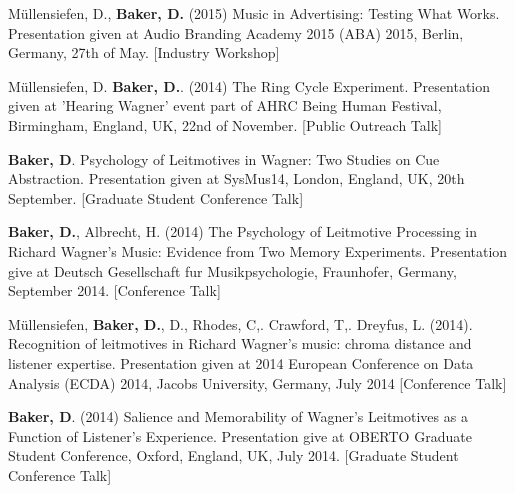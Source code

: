 M\"{u}llensiefen, D., \textbf{Baker, D.} (2015) Music in Advertising: Testing What Works. Presentation given at Audio Branding Academy 2015 (ABA) 2015, Berlin, Germany, 27th of May. [Industry Workshop]

M\"{u}llensiefen, D. \textbf{Baker, D.}. (2014) The Ring Cycle Experiment. Presentation given at 'Hearing Wagner' event part of AHRC Being Human Festival, Birmingham, England, UK, 22nd of November. [Public Outreach Talk]

\textbf{Baker, D}. Psychology of Leitmotives in Wagner: Two Studies on Cue Abstraction. Presentation given at SysMus14, London, England, UK, 20th September. [Graduate Student Conference Talk]

\textbf{Baker, D.}, Albrecht, H. (2014) The Psychology of Leitmotive Processing in Richard Wagner's Music: Evidence from Two Memory Experiments. Presentation give at Deutsch Gesellschaft fur Musikpsychologie, Fraunhofer, Germany, September 2014. [Conference Talk]

M\"{u}llensiefen, \textbf{Baker, D.}, D., Rhodes, C,. Crawford, T,. Dreyfus, L. (2014). Recognition of leitmotives in Richard Wagner's music: chroma distance and listener expertise. Presentation given at 2014 European Conference on Data Analysis (ECDA) 2014, Jacobs University, Germany, July 2014 [Conference Talk]

\textbf{Baker, D}. (2014) Salience and Memorability of Wagner's Leitmotives as a Function of Listener's Experience. Presentation give at OBERTO Graduate Student Conference, Oxford, England, UK, July 2014. [Graduate Student Conference Talk]









